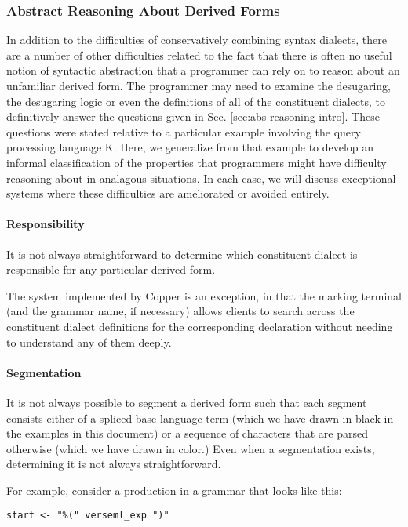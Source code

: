 {\subsubsection{Abstract Reasoning About Derived Forms}
In addition to the difficulties of conservatively combining syntax dialects, there are a  number of other difficulties related to the fact that there is often no useful notion of syntactic abstraction that a programmer can rely on to reason about an unfamiliar derived form. The programmer may need to examine the desugaring, the desugaring logic or even the definitions of all of the constituent dialects, to definitively answer the questions given in Sec. \ref{sec:abs-reasoning-intro}. These questions were stated relative to a particular example involving the query processing language K.  
Here, we generalize from that example to develop an informal classification of the properties that programmers might have difficulty reasoning about in analagous situations. In each case, we will discuss exceptional systems where these difficulties are ameliorated or avoided entirely.%

\paragraph{Responsibility} It is not always straightforward to determine which constituent dialect is responsible for any particular derived form.

The system implemented by Copper \cite{conf/pldi/SchwerdfegerW09,schwerdfeger2010context} is an exception, in that the marking terminal (and the grammar name, if necessary) allows clients to search across the constituent dialect definitions for the corresponding declaration without needing to understand any of them deeply.

\paragraph{Segmentation} It is not always possible to segment a derived form such that each segment consists either of a spliced base language term (which we have drawn in black in the examples in this document) or a sequence of characters that are parsed otherwise (which we have drawn in color.) Even when a segmentation exists, determining it is not always straightforward.

For example, consider a production in a grammar that looks like this: 
\begin{lstlisting}[numbers=none]
start <- "%(" verseml_exp ")"
\end{lstlisting}

}
